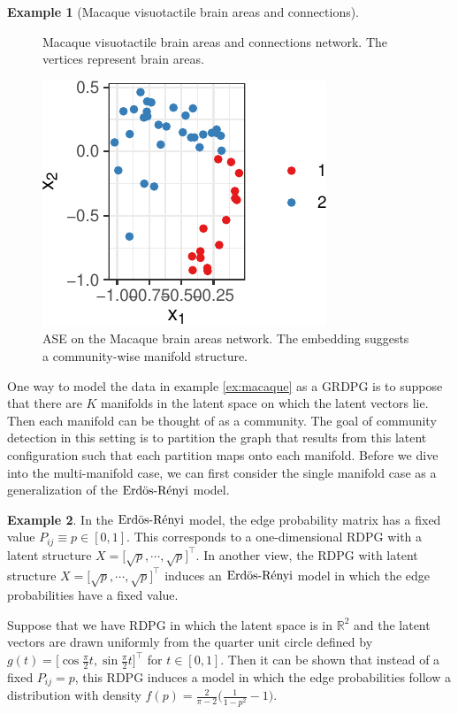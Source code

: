 \documentclass[
  12pt,
]{article}
\theoremstyle{definition}
\theoremstyle{definition}
\newtheorem{example}{Example}[section]
\theoremstyle{definition}
\theoremstyle{definition}
\theoremstyle{remark}
\begin{document}
\begin{example}[Macaque visuotactile brain areas and connections]
\begin{figure}[H]
{}

\caption{Macaque visuotactile brain areas and connections network. The vertices represent brain areas.}\label{fig:macaque-graph}
\end{figure}

\begin{figure}[H]

{\centering \includegraphics{draft_files/figure-latex/macaque-ase-1} 

}

\caption{ASE on the Macaque brain areas network. The embedding suggests a community-wise manifold structure.}\label{fig:macaque-ase}
\end{figure}
\label{macaque}
\end{example}

One way to model the data in example \ref{ex:macaque} as a GRDPG is to suppose that there are \(K\) manifolds in the latent space on which the latent vectors lie.
Then each manifold can be thought of as a community.
The goal of community detection in this setting is to partition the graph that results from this latent configuration such that each partition maps onto each manifold.
Before we dive into the multi-manifold case, we can first consider the single manifold case as a generalization of the \(\text{Erd\"{o}s-R\'{e}nyi}\) model.

\begin{example}
In the $\text{Erd\"{o}s-R\'{e}nyi}$ model, the edge probability matrix has a fixed value $P_{ij} \equiv p \in [0, 1]$. 
This corresponds to a one-dimensional RDPG with a latent structure $X = \Big[ \sqrt{p},  \cdots, \sqrt{p} \Big]^\top$. 
In another view, the RDPG with latent structure $X = \Big[ \sqrt{p}, \cdots, \sqrt{p} \Big]^\top$ induces an $\text{Erd\"{o}s-R\'{e}nyi}$ model in which the edge probabilities have a fixed value. 

Suppose that we have RDPG in which the latent space is in $\mathbb{R}^2$ and the latent vectors are drawn uniformly from the quarter unit circle defined by $g(t) = \Big[ \cos \frac{\pi}{2} t, \sin \frac{\pi}{2} t \Big]^\top$ for $t \in [0, 1]$. 
Then it can be shown that instead of a fixed $P_{ij} = p$, this RDPG induces a model in which the edge probabilities follow a distribution with density $f(p) = \frac{2}{\pi - 2} \Big( \frac{1}{1 - p^2} - 1 \Big)$. 
\end{example}
\end{document}
